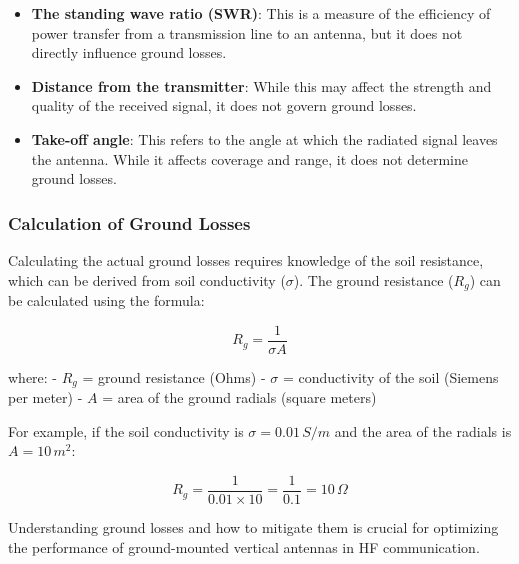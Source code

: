 \begin{itemize}
    \item \textbf{The standing wave ratio (SWR)}: This is a measure of the efficiency of power transfer from a transmission line to an antenna, but it does not directly influence ground losses.
    \item \textbf{Distance from the transmitter}: While this may affect the strength and quality of the received signal, it does not govern ground losses.
    \item \textbf{Take-off angle}: This refers to the angle at which the radiated signal leaves the antenna. While it affects coverage and range, it does not determine ground losses.
\end{itemize}

\subsubsection{Calculation of Ground Losses}
Calculating the actual ground losses requires knowledge of the soil resistance, which can be derived from soil conductivity (\(\sigma\)). The ground resistance (\(R_g\)) can be calculated using the formula:

\[
R_g = \frac{1}{\sigma A}
\]

where:
- \(R_g\) = ground resistance (Ohms)
- \(\sigma\) = conductivity of the soil (Siemens per meter)
- \(A\) = area of the ground radials (square meters)

For example, if the soil conductivity is \(\sigma = 0.01 \, S/m\) and the area of the radials is \(A = 10 \, m^2\):

\[
R_g = \frac{1}{0.01 \times 10} = \frac{1}{0.1} = 10 \, \Omega
\]

Understanding ground losses and how to mitigate them is crucial for optimizing the performance of ground-mounted vertical antennas in HF communication.




    
